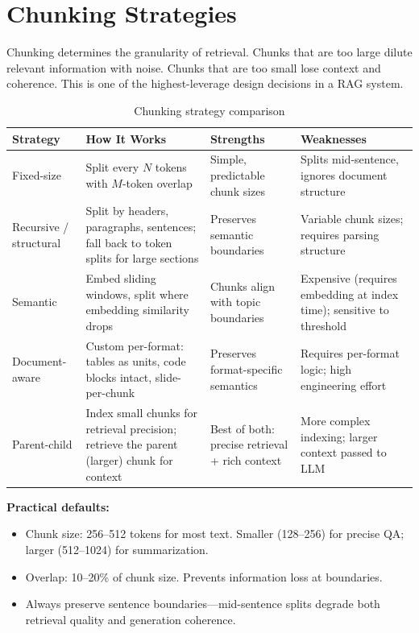 \section{Chunking Strategies}
\label{sec:chunking}

Chunking determines the granularity of retrieval. Chunks that are too large dilute relevant information with noise. Chunks that are too small lose context and coherence. This is one of the highest-leverage design decisions in a RAG system.

\begin{table}[H]
\centering
\caption{Chunking strategy comparison}
\begin{tabularx}{\textwidth}{lXXX}
\toprule
\textbf{Strategy} & \textbf{How It Works} & \textbf{Strengths} & \textbf{Weaknesses} \\
\midrule
Fixed-size & Split every $N$ tokens with $M$-token overlap & Simple, predictable chunk sizes & Splits mid-sentence, ignores document structure \\
Recursive / structural & Split by headers, paragraphs, sentences; fall back to token splits for large sections & Preserves semantic boundaries & Variable chunk sizes; requires parsing structure \\
Semantic & Embed sliding windows, split where embedding similarity drops & Chunks align with topic boundaries & Expensive (requires embedding at index time); sensitive to threshold \\
Document-aware & Custom per-format: tables as units, code blocks intact, slide-per-chunk & Preserves format-specific semantics & Requires per-format logic; high engineering effort \\
Parent-child & Index small chunks for retrieval precision; retrieve the parent (larger) chunk for context & Best of both: precise retrieval + rich context & More complex indexing; larger context passed to LLM \\
\bottomrule
\end{tabularx}
\end{table}

\textbf{Practical defaults:}
\begin{itemize}
    \item Chunk size: 256--512 tokens for most text. Smaller (128--256) for precise QA; larger (512--1024) for summarization.
    \item Overlap: 10--20\% of chunk size. Prevents information loss at boundaries.
    \item Always preserve sentence boundaries---mid-sentence splits degrade both retrieval quality and generation coherence.
\end{itemize}

